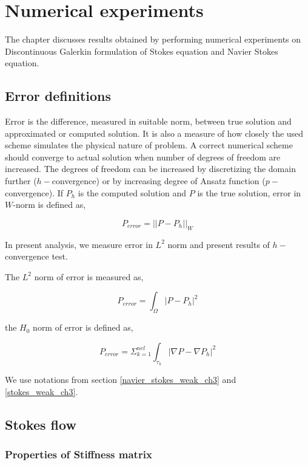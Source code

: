 \documentclass[a4paper,12pt]{book}
\begin{document}
\chapter{Numerical experiments}

The chapter discusses results obtained by performing numerical experiments on Discontinuous Galerkin formulation of Stokes equation and Navier Stokes equation.

\section{Error definitions}

Error is the difference, measured in suitable norm, between true solution and approximated or computed solution. It is also a measure of how closely the used scheme simulates the physical nature of problem. A correct numerical scheme should converge to actual solution when number of degrees of freedom are increased. The degrees of freedom can be increased by discretizing the domain further ($h-$convergence) or by increasing degree of Ansatz function ($p-$convergence). If $P_h$ is the computed solution and $P$ is the true solution, error in $W$-norm is defined as,

\begin{equation} \label{error_definition}
P_{error} = ||P - P_h||_{W}
\end{equation}

In present analysis, we measure error in $L^2$ norm and present results of $h-$convergence test.

The $L^2$ norm of error is measured as,

\begin{equation}
P_{error} = \int_{\Omega} |P - P_h|^2
\end{equation}

the $H_0$ norm of error is defined as,

\begin{equation}
P_{error} = \Sigma_{k=1}^{nel} \int_{\tau_k} |\nabla P - \nabla P_h|^2
\end{equation}


We use notations from section \ref{navier_stokes_weak_ch3} and \ref{stokes_weak_ch3}.

\section{Stokes flow}

\subsection{Properties of Stiffness matrix}
\end{document}
